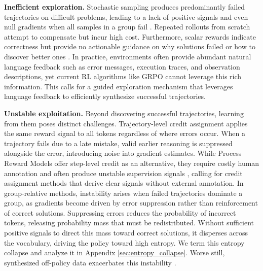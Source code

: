 \documentclass[11pt]{article}
\theoremstyle{definition}
\theoremstyle{remark}
\begin{document}
\textbf{Inefficient exploration.} Stochastic sampling produces predominantly failed trajectories on difficult problems, leading to a lack of positive signals and even null gradients when all samples in a group fail \cite{nan2025ngrpo}. Repeated rollouts from scratch attempt to compensate but incur high cost. Furthermore, scalar rewards indicate correctness but provide no actionable guidance on why solutions failed or how to discover better ones \cite{scheurer2022training,scheurer2023training,zhang2025critique}. In practice, environments often provide abundant natural language feedback such as error messages, execution traces, and observation descriptions, yet current RL algorithms like GRPO cannot leverage this rich information. This calls for a guided exploration mechanism that leverages language feedback to efficiently synthesize successful trajectories. 

\textbf{Unstable exploitation.} Beyond discovering successful trajectories, learning from them poses distinct challenges. Trajectory-level credit assignment applies the same reward signal to all tokens regardless of where errors occur. When a trajectory fails due to a late mistake, valid earlier reasoning is suppressed alongside the error, introducing noise into gradient estimates. While Process Reward Models \cite{lightman2023let} offer step-level credit as an alternative, they require costly human annotation and often produce unstable supervision signals \cite{xiong2024watch}, calling for credit assignment methods that derive clear signals without external annotation. In group-relative methods, instability arises when failed trajectories dominate a group, as gradients become driven by error suppression rather than reinforcement of correct solutions. Suppressing errors reduces the probability of incorrect tokens, releasing probability mass that must be redistributed. Without sufficient positive signals to direct this mass toward correct solutions, it disperses across the vocabulary, driving the policy toward high entropy. We term this entropy collapse and analyze it in Appendix \ref{sec:entropy_collapse}. Worse still, synthesized off-policy data exacerbates this instability \cite{wu2025learning}.


\end{document}
